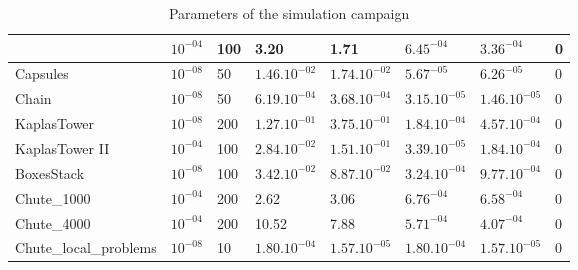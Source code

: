 \begin{table}
\begin{tabular}{|l|l|l|l|l|l|l|l|}
  & $10^{-04}$
  & 100
  & 3.20
  & 1.71
  & $6.45^{-04}$
  & $3.36^{-04}$
  & 0
  \\
  \hline
  Capsules
  & $10^{-08}$
  & 50
  & $1.46.10^{-02}$
  & $1.74.10^{-02}$
  & $5.67^{-05}$
  & $6.26^{-05}$
  & 0
  \\
  \hline
  Chain
  & $10^{-08}$
  & 50
  & $6.19.10^{-04}$
  & $3.68.10^{-04}$
  & $3.15.10^{-05}$
  & $1.46.10^{-05}$
  & 0
  \\
  \hline
  KaplasTower
  & $10^{-08}$
  & 200
  & $1.27.10^{-01}$
  & $3.75.10^{-01}$
  & $1.84.10^{-04}$
  & $4.57.10^{-04}$
  & 0
  \\
  \hline
  KaplasTower II
  & $10^{-04}$
  & 100
  & $2.84.10^{-02}$
  & $1.51.10^{-01}$
  & $3.39.10^{-05}$
  & $1.84.10^{-04}$
  & 0
  \\
  \hline
  BoxesStack
  & $10^{-08}$
  & 100
  & $3.42.10^{-02}$
  & $8.87.10^{-02}$
  & $3.24.10^{-04}$
  & $9.77.10^{-04}$
  & 0
  \\
  \hline
  Chute\_1000
  & $10^{-04}$
  & 200
  & 2.62
  & 3.06
  & $6.76^{-04}$
  & $6.58^{-04}$
  & 0
  \\
  \hline
  Chute\_4000
  & $10^{-04}$
  & 200
  & 10.52
  & 7.88
  & $5.71^{-04}$
  & $4.07^{-04}$
  & 0
  \\
  \hline
  Chute\_local\_problems
  & $10^{-08}$
  & 10
  & $1.80.10^{-04}$
  & $1.57.10^{-05}$
  & $1.80.10^{-04}$
  & $1.57.10^{-05}$
  &  0 \\
  \hline
\end{tabular}
\caption{Parameters of the simulation campaign}
\label{Tab:fclib-simulation}
\end{table}


